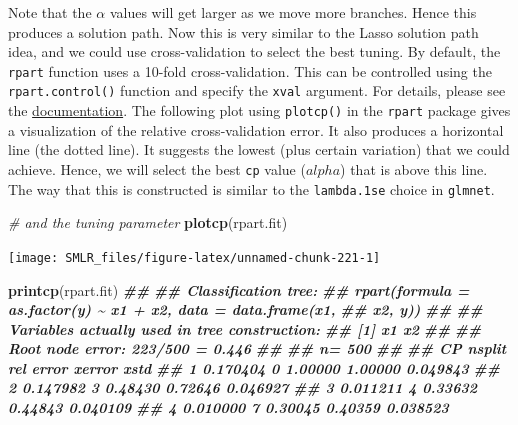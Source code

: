 \documentclass[
]{book}
\newenvironment{Shaded}{\begin{snugshade}}{\end{snugshade}}
\newcommand{\CommentTok}[1]{\textcolor[rgb]{0.56,0.35,0.01}{\textit{#1}}}
\newcommand{\DocumentationTok}[1]{\textcolor[rgb]{0.56,0.35,0.01}{\textbf{\textit{#1}}}}
\newcommand{\FunctionTok}[1]{\textcolor[rgb]{0.13,0.29,0.53}{\textbf{#1}}}
\newcommand{\NormalTok}[1]{#1}
\theoremstyle{definition}
\theoremstyle{definition}
\theoremstyle{definition}
\theoremstyle{definition}
\theoremstyle{remark}
\begin{document}
Note that the \(\alpha\) values will get larger as we move more branches. Hence this produces a solution path. Now this is very similar to the Lasso solution path idea, and we could use cross-validation to select the best tuning. By default, the \texttt{rpart} function uses a 10-fold cross-validation. This can be controlled using the \texttt{rpart.control()} function and specify the \texttt{xval} argument. For details, please see the \href{https://cran.r-project.org/web/packages/rpart/rpart.pdf}{documentation}. The following plot using \texttt{plotcp()} in the \texttt{rpart} package gives a visualization of the relative cross-validation error. It also produces a horizontal line (the dotted line). It suggests the lowest (plus certain variation) that we could achieve. Hence, we will select the best \texttt{cp} value (\(alpha\)) that is above this line. The way that this is constructed is similar to the \texttt{lambda.1se} choice in \texttt{glmnet}.

\begin{Shaded}
\begin{Highlighting}[]
  \CommentTok{\# and the tuning parameter }
  \FunctionTok{plotcp}\NormalTok{(rpart.fit)  }
\end{Highlighting}
\end{Shaded}

\begin{center}\texttt{[image: SMLR\_files/figure-latex/unnamed-chunk-221-1]} \end{center}

\begin{Shaded}
\begin{Highlighting}[]
  \FunctionTok{printcp}\NormalTok{(rpart.fit)}
\DocumentationTok{\#\# }
\DocumentationTok{\#\# Classification tree:}
\DocumentationTok{\#\# rpart(formula = as.factor(y) \textasciitilde{} x1 + x2, data = data.frame(x1, }
\DocumentationTok{\#\#     x2, y))}
\DocumentationTok{\#\# }
\DocumentationTok{\#\# Variables actually used in tree construction:}
\DocumentationTok{\#\# [1] x1 x2}
\DocumentationTok{\#\# }
\DocumentationTok{\#\# Root node error: 223/500 = 0.446}
\DocumentationTok{\#\# }
\DocumentationTok{\#\# n= 500 }
\DocumentationTok{\#\# }
\DocumentationTok{\#\#         CP nsplit rel error  xerror     xstd}
\DocumentationTok{\#\# 1 0.170404      0   1.00000 1.00000 0.049843}
\DocumentationTok{\#\# 2 0.147982      3   0.48430 0.72646 0.046927}
\DocumentationTok{\#\# 3 0.011211      4   0.33632 0.44843 0.040109}
\DocumentationTok{\#\# 4 0.010000      7   0.30045 0.40359 0.038523}
\end{Highlighting}
\end{Shaded}
\end{document}
